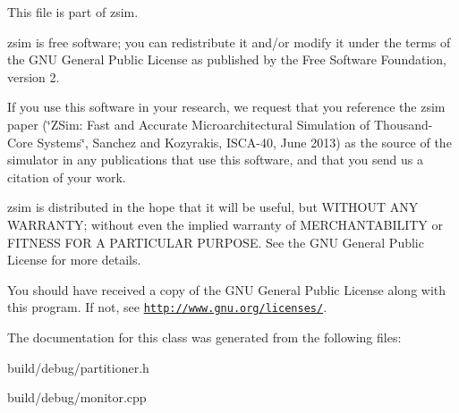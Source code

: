 This file is part of zsim.

zsim is free software; you can redistribute it and/or modify it under the terms of the G\-N\-U General Public License as published by the Free Software Foundation, version 2.

If you use this software in your research, we request that you reference the zsim paper (\char`\"{}\-Z\-Sim\-: Fast and Accurate Microarchitectural Simulation of
\-Thousand-\/\-Core Systems\char`\"{}, Sanchez and Kozyrakis, I\-S\-C\-A-\/40, June 2013) as the source of the simulator in any publications that use this software, and that you send us a citation of your work.

zsim is distributed in the hope that it will be useful, but W\-I\-T\-H\-O\-U\-T A\-N\-Y W\-A\-R\-R\-A\-N\-T\-Y; without even the implied warranty of M\-E\-R\-C\-H\-A\-N\-T\-A\-B\-I\-L\-I\-T\-Y or F\-I\-T\-N\-E\-S\-S F\-O\-R A P\-A\-R\-T\-I\-C\-U\-L\-A\-R P\-U\-R\-P\-O\-S\-E. See the G\-N\-U General Public License for more details.

You should have received a copy of the G\-N\-U General Public License along with this program. If not, see \href{http://www.gnu.org/licenses/}{\tt http\-://www.\-gnu.\-org/licenses/}. 

The documentation for this class was generated from the following files\-:\begin{DoxyCompactItemize}
\item 
build/debug/partitioner.\-h\item 
build/debug/monitor.\-cpp\end{DoxyCompactItemize}
